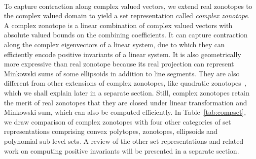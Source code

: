 \begin{table}
\caption{Comparison of set representations}~\label{tab:compset}
\end{table}


To capture contraction along complex valued vectors, we extend real
zonotopes to the complex valued domain to yield a set representation
called {\it complex zonotope}.  A complex zonotope is a linear
combination of complex valued vectors with absolute valued bounds on
the combining coefficients.  It can capture contraction along the
complex eigenvectors of a linear system, due to which they can
efficiently encode positive invariants of a linear system.  It is also
geometrically more expressive than real zonotope because its real
projection can represent Minkowski sums of some ellipsoids in addition
to line segments.  They are also different from other extensions of
complex zonotopes, like quadratic
zonotopes~\cite{DBLP:conf/aplas/AdjeGW15}, which we shall explain
later in a separate section.  Still, complex zonotopes retain the
merit of real zonotopes that they are closed under linear
transformation and Minkowski sum, which can also be computed
efficiently.  In Table~\ref{tab:compset}, we draw comparison of
complex zonotopes with four other categories of set representations
comprising convex polytopes, zonotopes, ellipsoids and polynomial
sub-level sets.  A review of the other set representations and related
work on computing positive invariants will be presented in a separate
section.

